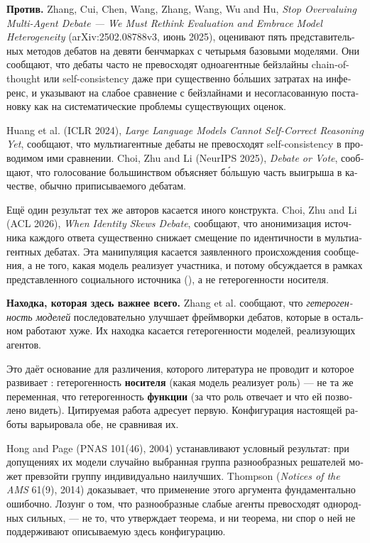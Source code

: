 \begin{russian}
\textbf{Против.} \gcheck{} Zhang, Cui, Chen, Wang, Zhang, Wang, Wu and Hu, \emph{Stop Overvaluing Multi-Agent Debate — We Must Rethink Evaluation and Embrace Model Heterogeneity} (arXiv:2502.08788v3, июнь 2025), оценивают пять представительных методов дебатов на девяти бенчмарках с четырьмя базовыми моделями. Они сообщают, что дебаты часто не превосходят одноагентные бейзлайны chain-of-thought или self-consistency даже при существенно бо́льших затратах на инференс, и указывают на слабое сравнение с бейзлайнами и несогласованную постановку как на систематические проблемы существующих оценок.

\gcheck{} Huang et al. (ICLR 2024), \emph{Large Language Models Cannot Self-Correct Reasoning Yet}, сообщают, что мультиагентные дебаты не превосходят self-consistency в проводимом ими сравнении. \gcheck{} Choi, Zhu and Li (NeurIPS 2025), \emph{Debate or Vote}, сообщают, что голосование большинством объясняет бо́льшую часть выигрыша в качестве, обычно приписываемого дебатам.

Ещё один результат тех же авторов касается иного конструкта. \gcheck{} Choi, Zhu and Li (ACL 2026), \emph{When Identity Skews Debate}, сообщают, что анонимизация источника каждого ответа существенно снижает смещение по идентичности в мультиагентных дебатах. Эта манипуляция касается заявленного происхождения сообщения, а не того, какая модель реализует участника, и потому обсуждается в рамках представленного социального источника (), а не гетерогенности носителя.

\textbf{Находка, которая здесь важнее всего.} \gcheck{} Zhang et al. сообщают, что \emph{гетерогенность моделей} последовательно улучшает фреймворки дебатов, которые в остальном работают хуже. Их находка касается гетерогенности моделей, реализующих агентов.

Это даёт основание для различения, которого литература не проводит и которое развивает : гетерогенность \textbf{носителя} (какая модель реализует роль) — не та же переменная, что гетерогенность \textbf{функции} (за что роль отвечает и что ей позволено видеть). Цитируемая работа адресует первую. Конфигурация настоящей работы варьировала обе, не сравнивая их.

\gcheck{} Hong and Page (PNAS 101(46), 2004) устанавливают условный результат: при допущениях их модели случайно выбранная группа разнообразных решателей может превзойти группу индивидуально наилучших. \gcheck{} Thompson (\emph{Notices of the AMS} 61(9), 2014) доказывает, что применение этого аргумента фундаментально ошибочно. Лозунг о том, что разнообразные слабые агенты превосходят однородных сильных, — не то, что утверждает теорема, и ни теорема, ни спор о ней не поддерживают описываемую здесь конфигурацию.


\end{russian}
